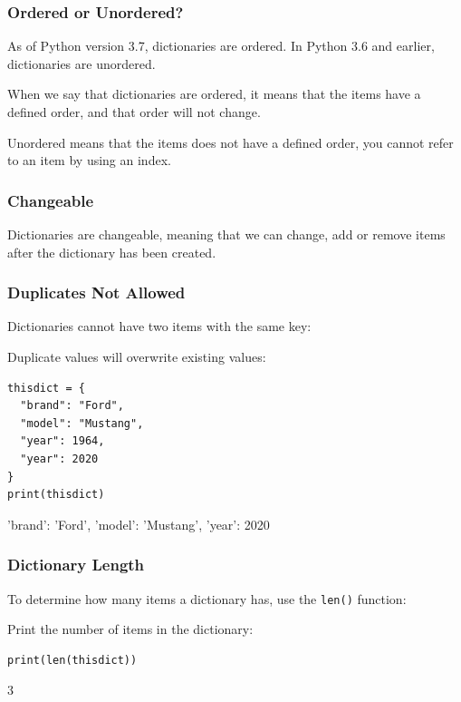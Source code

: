 \documentclass[12pt,a4paper]{article}
\newcommand{\code}[1]{%
	\colorbox{backcolour}{\lstinline{#1}}%
}
\begin{document}
\subsubsection{Ordered or Unordered?}

\begin{nbox}
	As of Python version 3.7, dictionaries are ordered. In Python 3.6 and
	earlier, dictionaries are unordered.
\end{nbox}

When we say that dictionaries are ordered, it means that the items have a
defined order, and that order will not change.

Unordered means that the items does not have a defined order, you cannot refer
to an item by using an index.
\subsubsection{Changeable}

Dictionaries are changeable, meaning that we can change, add or remove items
after the dictionary has been created.
\subsubsection{Duplicates Not Allowed}

Dictionaries cannot have two items with the same key:

\begin{ebox}
Duplicate values will overwrite existing values:
	\begin{lstlisting}
thisdict = {
  "brand": "Ford",
  "model": "Mustang",
  "year": 1964,
  "year": 2020
}
print(thisdict)
	\end{lstlisting}
\tcblower
	\begin{vercode}
{'brand': 'Ford', 'model': 'Mustang', 'year': 2020}
	\end{vercode}
\end{ebox}
\subsubsection{Dictionary Length}

To determine how many items a dictionary has, use the \code{len()} function:

\begin{ebox}
Print the number of items in the dictionary:
	\begin{lstlisting}
print(len(thisdict))
	\end{lstlisting}
\tcblower
	\begin{vercode}
3
	\end{vercode}
\end{ebox}
\end{document}
